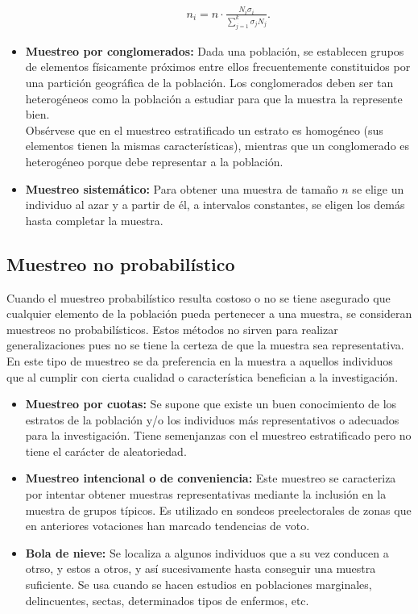 \begin{itemize}
\begin{enumerate}
\begin{align*}
            n_i = n \cdot \frac{N_i \sigma_i}{\sum_{j=1}^{k}{\sigma_j N_j}}.
        \end{align*}
    \end{enumerate}
    \item \textbf{Muestreo por conglomerados:} Dada una población, se establecen grupos de elementos físicamente próximos entre ellos frecuentemente constituidos por una partición geográfica de la población. Los conglomerados deben ser tan heterogéneos como la población a estudiar para que la muestra la represente bien.
    \\
    \newline
    Obsérvese que en el muestreo estratificado un estrato es homogéneo (sus elementos tienen la mismas características), mientras que un conglomerado es heterogéneo porque debe representar a la población.
    \item \textbf{Muestreo sistemático:} Para obtener una muestra de tamaño $n$ se elige un individuo al azar y a partir de él, a intervalos constantes, se eligen los demás hasta completar la muestra.
\end{itemize}

\subsection{Muestreo no probabilístico}
Cuando el muestreo probabilístico resulta costoso o no se tiene asegurado que cualquier elemento de la población pueda pertenecer a una muestra, se consideran muestreos no probabilísticos. Estos métodos no sirven para realizar generalizaciones pues no se tiene la certeza de que la muestra sea representativa.
\\
\newline
En este tipo de muestreo se da preferencia en la muestra a aquellos individuos que al cumplir con cierta cualidad o característica benefician a la investigación.
\begin{itemize}
    \item \textbf{Muestreo por cuotas:} Se supone que existe un buen conocimiento de los estratos de la población y/o los individuos más representativos o adecuados para la investigación. Tiene semenjanzas con el muestreo estratificado pero no tiene el carácter de aleatoriedad.
    \item \textbf{Muestreo intencional o de conveniencia:} Este muestreo se caracteriza por intentar obtener muestras representativas mediante la inclusión en la muestra de grupos típicos. Es utilizado en sondeos preelectorales de zonas que en anteriores votaciones han marcado tendencias de voto.
    \item \textbf{Bola de nieve: } Se localiza a algunos individuos que a su vez conducen a otrso, y estos a otros, y así sucesivamente hasta conseguir una muestra suficiente. Se usa cuando se hacen estudios en poblaciones marginales, delincuentes, sectas, determinados tipos de enfermos, etc.
\end{itemize}

